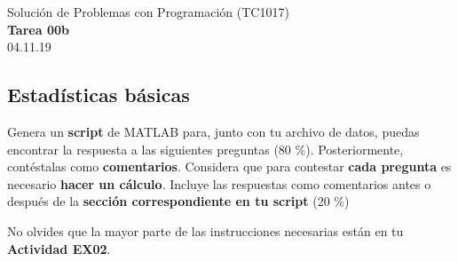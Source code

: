 \documentclass[]{book}
\theoremstyle{definition}
\begin{document}
\begin{center}
{\huge Solución de Problemas con Programación (TC1017)}\\[1.5ex]
{\large \textbf{Tarea 00b}\\[1.5ex] %
04.11.19} %
\end{center}

\vspace{0.2 cm}

\subsection*{Estadísticas básicas}

\bigskip

Genera un \textbf{script} de MATLAB para, junto con tu archivo de datos, puedas encontrar la respuesta a las siguientes preguntas (80 \%).
Posteriormente, contéstalas como \textbf{comentarios}. Considera que para contestar \textbf{cada pregunta} es necesario \textbf{hacer un cálculo}.
Incluye las respuestas como comentarios antes o después de la \textbf{sección correspondiente en tu script} (20 \%)

No olvides que la mayor parte de las instrucciones necesarias están en tu \textbf{Actividad EX02}.

\bigskip
\end{document}

